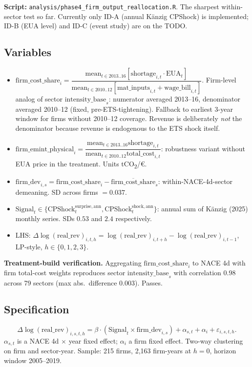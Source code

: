 \documentclass[11pt]{article}
\begin{document}
\textbf{Script:} \texttt{analysis/phase4\_firm\_output\_reallocation.R}. The sharpest within-sector test so far. Currently only ID-A (annual Känzig CPShock) is implemented; ID-B (EUA level) and ID-C (event study) are on the TODO.

\subsection{Variables}
\begin{itemize}
  \item $\mathrm{firm\_cost\_share}_i = \dfrac{\mathrm{mean}_{t \in 2013..16}[\mathrm{shortage}_{i,t} \cdot \mathrm{EUA}_t]}{\mathrm{mean}_{t \in 2010..12}[\mathrm{mat\_inputs}_{i,t} + \mathrm{wage\_bill}_{i,t}]}$. Firm-level analog of sector $\mathrm{intensity\_base}_s$: numerator averaged 2013--16, denominator averaged 2010--12 (fixed, pre-ETS-tightening). Fallback to earliest 3-year window for firms without 2010--12 coverage. Revenue is deliberately \emph{not} the denominator because revenue is endogenous to the ETS shock itself.
  \item $\mathrm{firm\_emint\_physical}_i = \dfrac{\mathrm{mean}_{t \in 2013..16} \mathrm{shortage}_{i,t}}{\mathrm{mean}_{t \in 2010..12} \mathrm{total\_cost}_{i,t}}$: robustness variant without EUA price in the treatment. Units tCO\textsubscript{2}/\euro.
  \item $\mathrm{firm\_dev}_{i,s} = \mathrm{firm\_cost\_share}_i - \overline{\mathrm{firm\_cost\_share}}_s$: within-NACE-4d-sector demeaning. SD across firms $= 0.037$.
  \item $\mathrm{Signal}_t \in \{\mathrm{CPShock}^{\mathrm{surprise},\mathrm{ann}}_t, \mathrm{CPShock}^{\mathrm{shock},\mathrm{ann}}_t\}$: annual sum of Känzig (2025) monthly series. SDs $0.53$ and $2.4$ respectively.
  \item LHS: $\Delta \log(\mathrm{real\_rev})_{i,t,h} = \log(\mathrm{real\_rev})_{i,t+h} - \log(\mathrm{real\_rev})_{i,t-1}$, LP-style, $h \in \{0,1,2,3\}$.
\end{itemize}

\textbf{Treatment-build verification.} Aggregating $\mathrm{firm\_cost\_share}_i$ to NACE 4d with firm total-cost weights reproduces sector $\mathrm{intensity\_base}_s$ with correlation $0.98$ across 79 sectors (max abs.\ difference $0.003$). Passes.

\subsection{Specification}
\begin{equation}
  \Delta \log(\mathrm{real\_rev})_{i,s,t,h} = \beta \cdot (\mathrm{Signal}_t \times \mathrm{firm\_dev}_{i,s}) + \alpha_{s,t} + \alpha_i + \varepsilon_{i,s,t,h}. \label{eq:spec1A}
\end{equation}
$\alpha_{s,t}$ is a NACE 4d $\times$ year fixed effect; $\alpha_i$ a firm fixed effect. Two-way clustering on firm and sector-year. Sample: 215 firms, 2,163 firm-years at $h=0$, horizon window 2005--2019.
\end{document}
